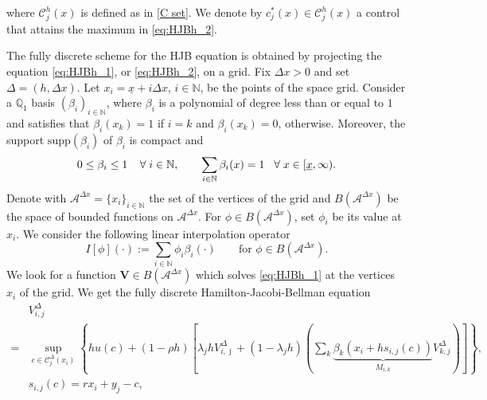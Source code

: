 \documentclass[11pt]{article}
\numberwithin{equation}{section}
\newcommand{\br}{\color{red}}
\newtheorem{proposition}[theorem]{Proposition}
\theoremstyle{Claim}
\newcommand{\NN}{{\mathbb{N}}}
\newcommand{\N}{\mathbb{N}}
\newcommand{\mA}{\mathcal A}
\newcommand{\mC}{\mathcal C}
\def\bV{{\mathbf{V}}}
\def\bjm{{\bar{\jmath}}}
\newcommand{\ux}{{\underline x}}
\theoremstyle{plain}
\newcommand{\D}{\Delta}
\newcommand{\Dx}{{\Delta x}}
\begin{document}
where $\mC^{h}_{j}(x)$ is defined as in \eqref{C set}. We denote by $c^*_j(x) \in \mC^{h}_{j}(x)$ a control that attains the maximum in \eqref{eq:HJBh_2}.\par
The fully discrete scheme for the HJB equation is obtained by projecting the equation \eqref{eq:HJBh_1}, or \eqref{eq:HJBh_2}, on a grid. Fix $\Dx>0$ and set $\Delta=(h,\Dx)$. Let $x_i=\ux+i \Dx$, $i\in\NN$, be the points of the space grid. Consider a   $\mathbb{Q}_1$ basis  $(\beta_{i})_{i\in \NN}$, where   $\beta_i$  is a polynomial of degree less than or equal to $1$ and satisfies that  $\beta_i(x_k)=1$ if $i=k$ and $\beta_i(x_k)=0$, otherwise. Moreover, the support $\mbox{supp}(\beta_i)$ of $\beta_i$ is compact and  
\begin{equation}\label{eq:baricentric}
	0\leq \beta_i \leq 1 \; \; \;  \; \forall \; i\in \NN, \qquad\sum_{i\in  \NN} \beta_i(x)=1 \hspace{0.3cm} \forall \; x\in [\ux,\infty).
\end{equation}
Denote with $\mA^\Dx =\{x_i\}_{i\in\NN}$ the set of the vertices of the grid and
  $B(\mA^\Dx)$ be the space of bounded functions on $\mA^\Dx$. For $\phi\in B(\mA^\Dx)$, set $ \phi_{i}$ be its value at $x_i$. We consider the following  linear interpolation operator 
\begin{equation}\label{Eq:intrep}
	I[\phi](\cdot):=\sum_{i\in  \NN} \phi_i\beta_i(\cdot) \qquad \mbox{for } \phi \in B(\mA^\Dx) .
\end{equation}
We look for a  function $\bV \in  B(\mA^\Dx) $ which solves  \eqref{eq:HJBh_1}   at the vertices $x_i$  of the grid. We get the fully discrete Hamilton-Jacobi-Bellman equation
\begin{equation}\label{eq:HJBhD_1}
\begin{aligned}
&V^{\D}_{i,j}	\\
={}&\sup_{c\in \mC^{\D}_{j}(x_i)}\left\{
		hu(c)+(1-\rho h)\left[\lambda_j hV^{\D}_{i,\bjm} 
		+(1-\lambda_jh)\left(\sum_k \underbrace{\beta_k(x_i+hs_{i,j}(c))}_{M_{i,k}}V^{\D}_{k,j}\right)\right]
		\right\},\\
& s_{i,j}(c)=rx_i+y_j-c,\\
\end{aligned}
\end{equation}
\end{document}

